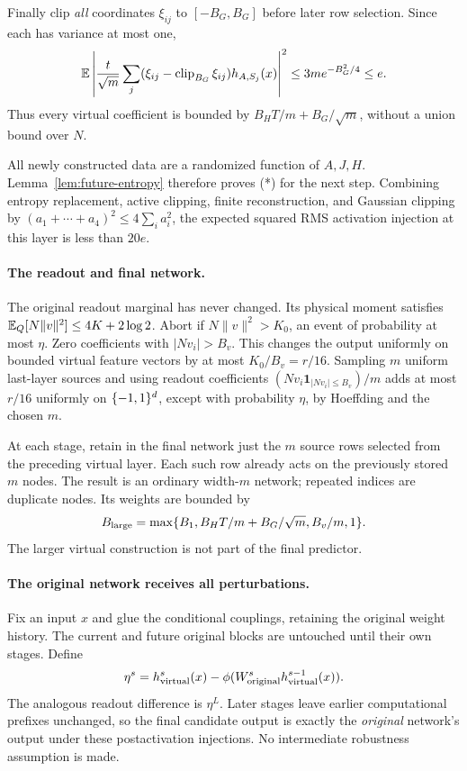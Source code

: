 Finally clip \emph{all} coordinates $\xi_{ij}$ to $[-B_G,B_G]$ before later
row selection. Since each has variance at most one,
\[
 \mathbb E\left|\frac{t}{\sqrt m}\sum_j
   (\xi_{ij}-\operatorname{clip}_{B_G}\xi_{ij})h_{A,S_j}(x)\right|^2
 \le3m e^{-B_G^2/4}\le e.
\]
Thus every virtual coefficient is bounded by $B_HT/m+B_G/\sqrt m$,
without a union bound over $N$.

All newly constructed data are a randomized function of $A,J,H$.
Lemma~\ref{lem:future-entropy} therefore proves (*) for the next step.
Combining entropy replacement, active clipping, finite reconstruction, and
Gaussian clipping by $(a_1+\cdots+a_4)^2\le4\sum_i a_i^2$, the expected
squared RMS activation injection at this layer is less than $20e$.

\paragraph{The readout and final network.}
The original readout marginal has never changed. Its physical moment satisfies
$\mathbb E_Q[N\|v\|^2]\le4K+2\log2$.
Abort if $N\|v\|^2>K_0$, an event of probability at most $\eta$.
Zero coefficients with $|Nv_i|>B_v$. This changes the output uniformly on
bounded virtual feature vectors by at most $K_0/B_v=r/16$.
Sampling $m$ uniform last-layer sources and using readout coefficients
$(Nv_i\mathbf1_{|Nv_i|\le B_v})/m$ adds at most $r/16$ uniformly on $\{-1,1\}^d$,
except with probability $\eta$, by Hoeffding and the chosen $m$.

At each stage, retain in the final network just the $m$ source rows selected
from the preceding virtual layer. Each such row already acts on the previously
stored $m$ nodes. The result is an ordinary width-$m$ network; repeated indices
are duplicate nodes. Its weights are bounded by
\[
 B_{\rm large}=\max\{B_1,B_HT/m+B_G/\sqrt m,B_v/m,1\}.
\]
The larger virtual construction is not part of the final predictor.

\paragraph{The original network receives all perturbations.}
Fix an input $x$ and glue the conditional couplings, retaining the original
weight history. The current and future original blocks are untouched until
their own stages. Define
\[
 \eta^s=h^s_{\rm virtual}(x)
           -\phi(W^s_{\rm original}h^{s-1}_{\rm virtual}(x)).
\]
The analogous readout difference is $\eta^L$. Later stages leave earlier
computational prefixes unchanged, so the final candidate output is exactly
the \emph{original} network's output under these postactivation injections.
No intermediate robustness assumption is made.


